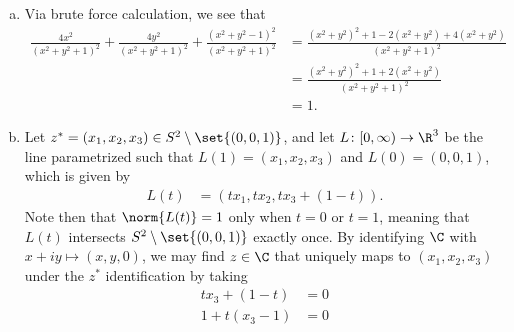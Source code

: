\documentclass[11pt]{mypackage}
\begin{document}
\begin{solution}\hfill
  \begin{enumerate}[(a)]
    \item Via brute force calculation, we see that
      \begin{align*}
        \frac{4x^2}{\left( x^2 + y^2 + 1 \right)^2} + \frac{4y^2}{\left( x^2 + y^2 + 1 \right)^2} + \frac{\left( x^2 + y^2 - 1 \right)^2}{\left( x^2 + y^2 + 1 \right)^2} &= \frac{\left( x^2 + y^2 \right)^2 + 1 - 2\left( x^2 + y^2 \right) + 4\left( x^2 + y^2 \right)}{\left( x^2 + y^2 + 1 \right)^2}\\
                                                                                                                                                                                                  &= \frac{\left( x^2 + y^2 \right)^2 + 1 + 2\left( x^2 + y^2 \right)}{\left( x^2 + y^2 + 1 \right)^2}\\
                                                                                                                                                                                                                                                                                                                                                                                                                                                                                                                                                                                   &= 1.
      \end{align*}
    \item Let $z^{\ast} = \left( x_1,x_2,x_3 \right)\in S^{2}\setminus \set{(0,0,1)}$, and let $L\colon [0,\infty)\rightarrow \R^3$ be the line parametrized such that $L(1) = \left( x_1,x_2,x_3 \right)$ and $L(0) = \left( 0,0,1 \right)$, which is given by
      \begin{align*}
        L(t) &= \left( tx_1,tx_2, tx_3 + \left( 1-t \right) \right).
      \end{align*}
      Note then that $\norm{L(t)} = 1$ only when $t = 0$ or $t = 1$, meaning that $L(t)$ intersects $S^{2}\setminus \set{(0,0,1)}$ exactly once. By identifying $\C$ with $x + iy \mapsto \left( x,y,0 \right)$, we may find $z\in \C$ that uniquely maps to $\left( x_1,x_2,x_3 \right)$ under the $z^{\ast}$ identification by taking
      \begin{align*}
        tx_3 + \left( 1-t \right) &= 0\\
        1 + t\left( x_3 - 1 \right) &= 0\\

\end{align*}
\end{enumerate}
\end{solution}
\end{document}

